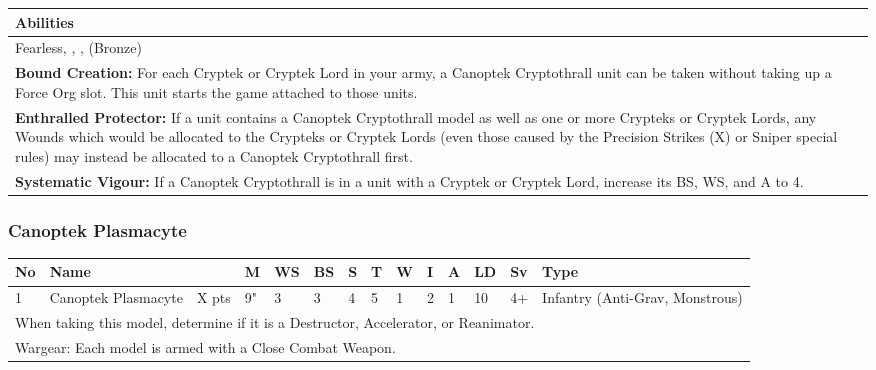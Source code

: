 \noindent
\begin{tabular}{||m{532pt}||}
	\hline
	Abilities \\
	\hline
	Fearless, \quickref{Living Metal}, \quickref{Reanimation Protocols}, \quickref{Soulless Hordes} (Bronze) \\
	\textbf{Bound Creation:} For each Cryptek or Cryptek Lord in your army, a Canoptek Cryptothrall unit can be taken without taking up a Force Org slot. This unit starts the game attached to those units. \\
	\textbf{Enthralled Protector:} If a unit contains a Canoptek Cryptothrall model as well as one or more Crypteks or Cryptek Lords, any Wounds which would be allocated to the Crypteks or Cryptek Lords (even those caused by the Precision Strikes (X) or Sniper special rules) may instead be allocated to a Canoptek Cryptothrall first. \\
	\textbf{Systematic Vigour:} If a Canoptek Cryptothrall is in a unit with a Cryptek or Cryptek Lord, increase its BS, WS, and A to 4. \\
	\hline
\end{tabular}


\newpage
\subsubsection{Canoptek Plasmacyte}

\noindent
\begin{tabular}{||m{10pt} m{95pt} m{30pt} m{11pt} m{11pt} m{11pt} m{11pt} m{11pt} m{11pt} m{11pt} m{11pt} m{11pt} m{11pt} m{125pt}||}
	\hline
	No & Name & & M & WS & BS & S & T & W & I & A & LD & Sv & Type \\
	\hline
	1 & Canoptek Plasmacyte & X pts & 9" & 3 & 3 & 4 & 5 & 1 & 2 & 1 & 10 & 4+ & Infantry (Anti-Grav, Monstrous) \\
	\hline
	\hline
	\multicolumn{14}{||Z{532 pt}||}{When taking this model, determine if it is a Destructor, Accelerator, or Reanimator.}\\	
	\hline
	\hline
	\multicolumn{14}{||Z{532 pt}||}{Wargear: Each model is armed with a Close Combat Weapon.} \\
	\hline
\end{tabular}

